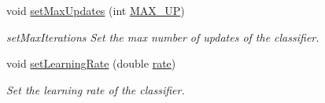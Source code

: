 \begin{DoxyCompactItemize}
void \hyperlink{class_classifier_ad8930d5e6002299bdb840d4542229f02}{set\+Max\+Updates} (int \hyperlink{class_classifier_abb8b95854801151e78a1d9f6a2173c22}{M\+A\+X\+\_\+\+UP})
\begin{DoxyCompactList}\small\item\em set\+Max\+Iterations Set the max number of updates of the classifier. \end{DoxyCompactList}\item 
void \hyperlink{class_classifier_a8f6818bd403afbb46d1bfd75c9731ab6}{set\+Learning\+Rate} (double \hyperlink{class_classifier_af9867e5919742de1303dd971a9a1c19a}{rate})
\begin{DoxyCompactList}\small\item\em Set the learning rate of the classifier. \end{DoxyCompactList}\end{DoxyCompactItemize}
